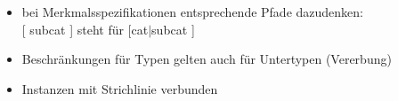 {%

\begin{itemize}[<+->]
\item bei Merkmalsspezifikationen entsprechende Pfade dazudenken:\\
      {}[ {\sc subcat} \liste{}] steht für [{\sc cat$|$subcat} \liste{} ]
\item Beschränkungen für Typen gelten auch für Untertypen (Vererbung)
\item Instanzen mit Strichlinie verbunden
\end{itemize}
}


